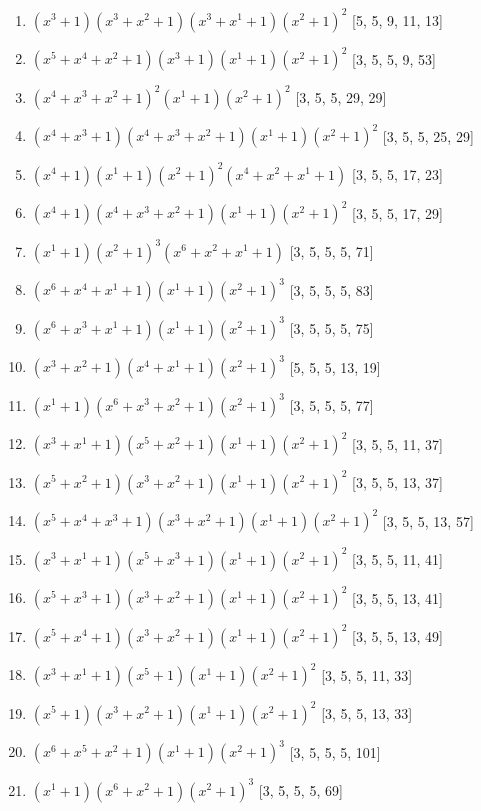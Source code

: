 \documentclass[10pt,twocolumn]{article}
\begin{document}
\begin{enumerate}
\item $(x^{3} + 1)(x^{3} + x^{2} + 1)(x^{3} + x^{1} + 1)(x^{2} + 1)^{2}$  [5, 5, 9, 11, 13]
\item $(x^{5} + x^{4} + x^{2} + 1)(x^{3} + 1)(x^{1} + 1)(x^{2} + 1)^{2}$  [3, 5, 5, 9, 53]
\item $(x^{4} + x^{3} + x^{2} + 1)^{2}(x^{1} + 1)(x^{2} + 1)^{2}$  [3, 5, 5, 29, 29]
\item $(x^{4} + x^{3} + 1)(x^{4} + x^{3} + x^{2} + 1)(x^{1} + 1)(x^{2} + 1)^{2}$  [3, 5, 5, 25, 29]
\item $(x^{4} + 1)(x^{1} + 1)(x^{2} + 1)^{2}(x^{4} + x^{2} + x^{1} + 1)$  [3, 5, 5, 17, 23]
\item $(x^{4} + 1)(x^{4} + x^{3} + x^{2} + 1)(x^{1} + 1)(x^{2} + 1)^{2}$  [3, 5, 5, 17, 29]
\item $(x^{1} + 1)(x^{2} + 1)^{3}(x^{6} + x^{2} + x^{1} + 1)$  [3, 5, 5, 5, 71]
\item $(x^{6} + x^{4} + x^{1} + 1)(x^{1} + 1)(x^{2} + 1)^{3}$  [3, 5, 5, 5, 83]
\item $(x^{6} + x^{3} + x^{1} + 1)(x^{1} + 1)(x^{2} + 1)^{3}$  [3, 5, 5, 5, 75]
\item $(x^{3} + x^{2} + 1)(x^{4} + x^{1} + 1)(x^{2} + 1)^{3}$  [5, 5, 5, 13, 19]
\item $(x^{1} + 1)(x^{6} + x^{3} + x^{2} + 1)(x^{2} + 1)^{3}$  [3, 5, 5, 5, 77]
\item $(x^{3} + x^{1} + 1)(x^{5} + x^{2} + 1)(x^{1} + 1)(x^{2} + 1)^{2}$  [3, 5, 5, 11, 37]
\item $(x^{5} + x^{2} + 1)(x^{3} + x^{2} + 1)(x^{1} + 1)(x^{2} + 1)^{2}$  [3, 5, 5, 13, 37]
\item $(x^{5} + x^{4} + x^{3} + 1)(x^{3} + x^{2} + 1)(x^{1} + 1)(x^{2} + 1)^{2}$  [3, 5, 5, 13, 57]
\item $(x^{3} + x^{1} + 1)(x^{5} + x^{3} + 1)(x^{1} + 1)(x^{2} + 1)^{2}$  [3, 5, 5, 11, 41]
\item $(x^{5} + x^{3} + 1)(x^{3} + x^{2} + 1)(x^{1} + 1)(x^{2} + 1)^{2}$  [3, 5, 5, 13, 41]
\item $(x^{5} + x^{4} + 1)(x^{3} + x^{2} + 1)(x^{1} + 1)(x^{2} + 1)^{2}$  [3, 5, 5, 13, 49]
\item $(x^{3} + x^{1} + 1)(x^{5} + 1)(x^{1} + 1)(x^{2} + 1)^{2}$  [3, 5, 5, 11, 33]
\item $(x^{5} + 1)(x^{3} + x^{2} + 1)(x^{1} + 1)(x^{2} + 1)^{2}$  [3, 5, 5, 13, 33]
\item $(x^{6} + x^{5} + x^{2} + 1)(x^{1} + 1)(x^{2} + 1)^{3}$  [3, 5, 5, 5, 101]
\item $(x^{1} + 1)(x^{6} + x^{2} + 1)(x^{2} + 1)^{3}$  [3, 5, 5, 5, 69]

\end{enumerate}
\end{document}
